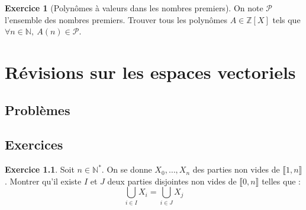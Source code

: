 \documentclass[french]{book}
\newcommand{\N}{\mathbb{N}}
\newcommand{\Z}{\mathbb{Z}}
\newcommand{\st}{^*}
\theoremstyle{definition}
\newtheorem{ex}{Exercice}[chapter]
\theoremstyle{remark}
\begin{document}
\begin{ex}[Polynômes à valeurs dans les nombres premiers]
	On note $\mathcal{P}$ l'ensemble des nombres premiers. Trouver tous les polynômes $A \in \Z[X]$ tels que $\forall n \in \N, \ A(n) \in \mathcal{P}$.
\end{ex}

\chapter{Révisions sur les espaces vectoriels}

\section{Problèmes}

\section{Exercices}

\begin{ex}
	Soit $n\in\N\st$. On se donne $X_0,\ldots,X_n$ des parties non vides de $\llbracket1,n\rrbracket$. Montrer qu'il existe $I$ et $J$ deux parties disjointes non vides de $\llbracket0,n\rrbracket$ telles que : $$\bigcup_{i\in I} X_i=\bigcup_{i\in J} X_j$$
\end{ex}
\end{document}
